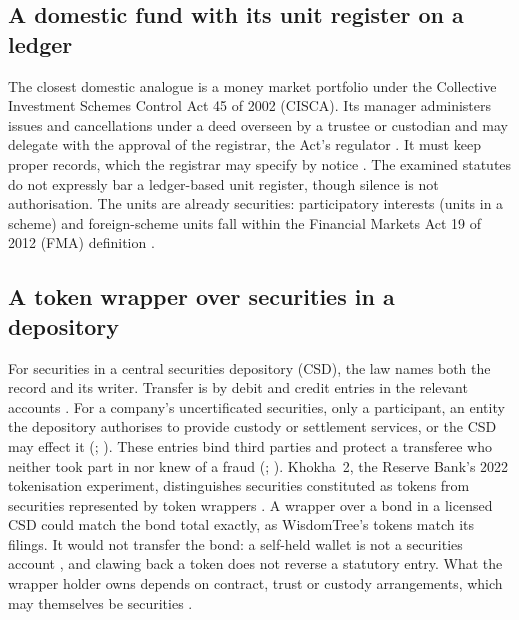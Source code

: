 \documentclass[12pt,a4paper]{article}
\begin{document}
\subsection{A domestic fund with its unit register on a ledger}\label{sec:sa_record}
The closest domestic analogue is a money market portfolio under the Collective Investment Schemes Control Act 45 of 2002 (CISCA). Its manager administers issues and cancellations under a deed overseen by a trustee or custodian and may delegate with the approval of the registrar, the Act's regulator \citep[s~1, pp.~1--3; s~4(5)(a), p.~5; s~70(1)(a), p.~26]{CISCA2002}. It must keep proper records, which the registrar may specify by notice \citep[ss~4(4)(b), 114(3)(a), pp.~5, 43]{CISCA2002}. The examined statutes do not expressly bar a ledger-based unit register, though silence is not authorisation. The units are already securities: participatory interests (units in a scheme) and foreign-scheme units fall within the Financial Markets Act 19 of 2012 (FMA) definition \citep[s~1, paras~(a)(v), (b), p.~10]{FMA2012}.

\subsection{A token wrapper over securities in a depository}\label{sec:sa_wrapper}
For securities in a central securities depository (CSD), the law names both the record and its writer. Transfer is by debit and credit entries in the relevant accounts \citep[s~38(1)(a), p.~48]{FMA2012}. For a company's uncertificated securities, only a participant, an entity the depository authorises to provide custody or settlement services, or the CSD may effect it (\citealp[s~53(1), p.~69]{CompaniesAct2008}; \citealp[s~1, p.~9]{FMA2012}). These entries bind third parties and protect a transferee who neither took part in nor knew of a fraud (\citealp[ss~38(3), 41(1), (3), pp.~48--49]{FMA2012}; \citealp[s~53(4), p.~69]{CompaniesAct2008}). Khokha~2, the Reserve Bank's 2022 tokenisation experiment, distinguishes securities constituted as tokens from securities represented by token wrappers \citep[p.~43]{SARB2022Khokha2}. A wrapper over a bond in a licensed CSD could match the bond total exactly, as WisdomTree's tokens match its filings. It would not transfer the bond: a self-held wallet is not a securities account \citep[s~1, p.~11]{FMA2012}, and clawing back a token does not reverse a statutory entry. What the wrapper holder owns depends on contract, trust or custody arrangements, which may themselves be securities \citep[s~1, para~(e), p.~10]{FMA2012}.
\end{document}
